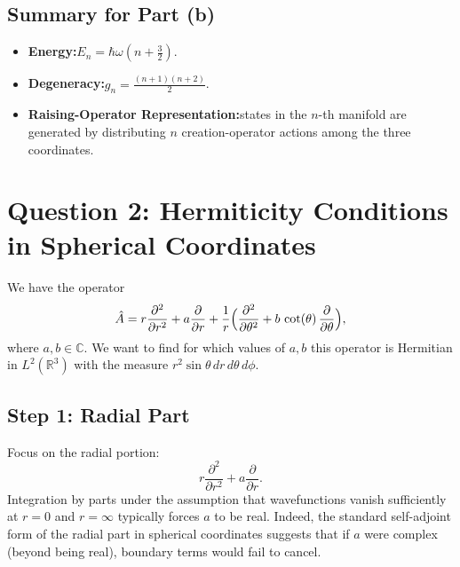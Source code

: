 \documentclass[12pt]{article}
\begin{document}
\subsection*{Summary for Part (b)}
\begin{itemize}
  \item \textbf{Energy:}\quad \(E_n = \hbar \omega (n + \tfrac{3}{2})\).
  \item \textbf{Degeneracy:}\quad \(g_n = \frac{(n+1)(n+2)}{2}\).
  \item \textbf{Raising-Operator Representation:}\quad states in the \(n\)-th manifold are generated by distributing \(n\) creation-operator actions among the three coordinates.
\end{itemize}





\section*{Question 2: Hermiticity Conditions in Spherical Coordinates}

We have the operator
\begin{equation}
\hat{A} = r \frac{\partial^2}{\partial r^2} + a \frac{\partial}{\partial r}
+ \frac{1}{r}\Bigl(\frac{\partial^2}{\partial \theta^2} + b \,\cot(\theta)\,\frac{\partial}{\partial \theta}\Bigr),
\end{equation}
where \(a,b \in \mathbb{C}\). We want to find for which values of \(a,b\) this operator is Hermitian in \(L^2(\mathbb{R}^3)\) with the measure \(r^2 \sin\theta\, dr\, d\theta\, d\phi\).

\subsection*{Step 1: Radial Part}
Focus on the radial portion:
\begin{equation}
r \frac{\partial^2}{\partial r^2} + a \frac{\partial}{\partial r}.
\end{equation}
Integration by parts under the assumption that wavefunctions vanish sufficiently at \(r = 0\) and \(r = \infty\) typically forces \(a\) to be real. Indeed, the standard self-adjoint form of the radial part in spherical coordinates suggests that if \(a\) were complex (beyond being real), boundary terms would fail to cancel.
\end{document}

